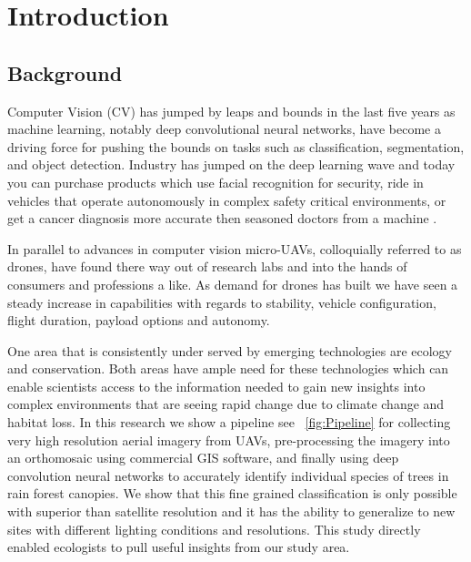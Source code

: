 
\chapter{Introduction} %

\label{Chapter1} %


\newcommand{\keyword}[1]{\textbf{#1}}
\newcommand{\tabhead}[1]{\textbf{#1}}
\newcommand{\code}[1]{\texttt{#1}}
\newcommand{\file}[1]{\texttt{\bfseries#1}}
\newcommand{\option}[1]{\texttt{\itshape#1}}


\section{Background}

Computer Vision (CV) has jumped by leaps and bounds in the last five years as machine learning, notably deep convolutional neural networks, have become a driving force for pushing the bounds on tasks such as classification, segmentation, and object detection. Industry has jumped on the deep learning wave and today you can purchase products which use facial recognition for security, ride in vehicles that operate autonomously in complex safety critical environments, or get a cancer diagnosis more accurate then seasoned doctors from a machine \cite{Cancer}.

In parallel to advances in computer vision micro-UAVs, colloquially referred to as drones, have found there way out of research labs and into the hands of consumers and professions a like. As demand for drones has built we have seen a steady increase in capabilities with regards to stability, vehicle configuration, flight duration, payload options and autonomy.

One area that is consistently under served by emerging technologies are ecology and conservation. Both areas have ample need for these technologies which can enable scientists access to the information needed to gain new insights into complex environments that are seeing rapid change due to climate change and habitat loss. In this research we show a pipeline see ~\ref{fig:Pipeline} for collecting very high resolution aerial imagery from UAVs, pre-processing the imagery into an orthomosaic using commercial GIS software, and finally using deep convolution neural networks to accurately identify individual species of trees in rain forest canopies. We show that this fine grained classification is only possible with superior than satellite resolution and it has the ability to generalize to new sites with different lighting conditions and resolutions. This study directly enabled ecologists to pull useful insights from our study area.

